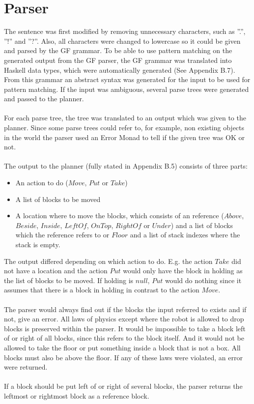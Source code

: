 \section{Parser}
The sentence was first modified by removing unnecessary characters, such as
''.'', ''!'' and ''?''. Also, all characters were changed to lowercase so it
could be given and parsed by the GF grammar. To be able to use pattern matching
on the generated output from the GF parser, the GF grammar was translated into
Haskell data types, which were automatically generated (See Appendix B.7). From
this grammar an abstract syntax was generated for the input to be used for
pattern matching. If the input was ambiguous, several parse trees were
generated and passed to the planner. \\\\
For each parse tree, the tree was translated to an output which was given to
the planner. Since some parse trees could refer to, for example, non existing
objects in the world the parser used an Error Monad to tell if the given tree
was OK or not. \\\\
The output to the planner (fully stated in Appendix B.5) consists of three parts:
\begin{itemize}
\item An action to do ($Move$, $Put$ or $Take$)
\item A list of blocks to be moved
\item A location where to move the blocks, which consists of an reference
        ($Above$, $Beside$, $Inside$, $LeftOf$, $OnTop$, $RightOf$ or $Under$)
        and a list of blocks which the reference refers to or $Floor$ and a
        list of stack indexes where the stack is empty.
\end{itemize}
The output differed depending on which action to do. E.g. the action $Take$ did
not have a location and the action $Put$ would only have the block in holding
as the list of blocks to be moved. If holding is $null$, $Put$ would do nothing
since it assumes that there is a block in holding in contrast to the action
$Move$.\\\\
The parser would always find out if the blocks the input referred to exists and
if not, give an error. All laws of physics except where the robot is allowed to
drop blocks is preserved within the parser. It would be impossible to take a
block left of or right of all blocks, since this refers to the block itself.
And it would not be allowed to take the floor or put something inside a block
that is not a box. All blocks must also be above the floor. If any of these
laws were violated, an error were returned.
 \\\\
If a block should be put left of or right of several blocks, the parser returns
the leftmost or rightmost block as a reference block. 

